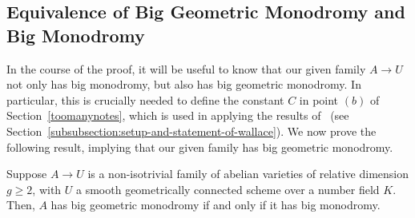 \subsection{Equivalence of Big Geometric Monodromy and Big Monodromy}
\label{subsection:big-geometric-monodromy-equivalence}
In the course of the proof, it will be useful to know that our given family
$A \rightarrow U$ not only has big monodromy, but also has big
geometric monodromy.
In particular, this is crucially needed to define the constant $C$ in point
$(b)$ of Section~\ref{toomanynotes}, which is used in 
applying the results of~\cite{scoopdedoo} (see Section~\ref{subsubsection:setup-and-statement-of-wallace}).
We now prove the following result, implying that our given family
has big geometric monodromy.

\begin{proposition}
	\label{proposition:big-geometric-monodromy-reduction}
	Suppose $A \rightarrow U$ is a non-isotrivial family of abelian varieties of relative dimension $g \geq 2$, with $U$ a smooth geometrically connected
	scheme over
	a number field $K$.
	Then, $A$ has big geometric monodromy if and only if it has big 
	monodromy.
\end{proposition}
